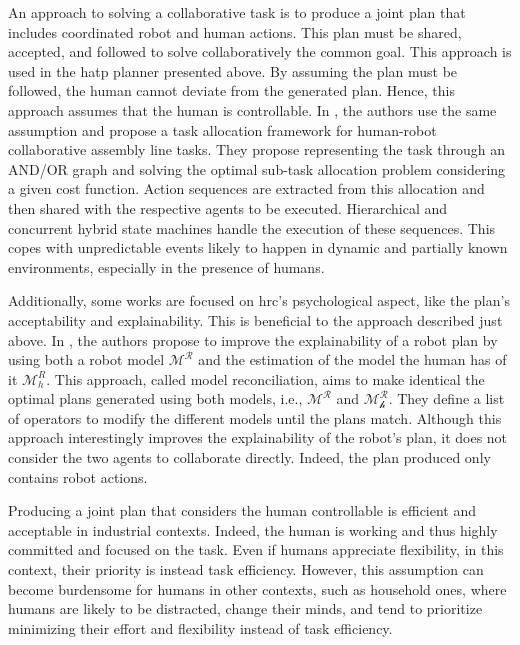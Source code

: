 An approach to solving a collaborative task is to produce a joint plan that includes coordinated robot and human actions. This plan must be shared, accepted, and followed to solve collaboratively the common goal. This approach is used in the \acrshort{hatp} planner presented above. By assuming the plan must be followed, the human cannot deviate from the generated plan. Hence, this approach assumes that the human is controllable. 
In \cite{johannsmeier2016hierarchical}, the authors use the same assumption and propose a task allocation framework for human-robot collaborative assembly line tasks. They propose representing the task through an AND/OR graph and solving the optimal sub-task allocation problem considering a given cost function. Action sequences are extracted from this allocation and then shared with the respective agents to be executed. Hierarchical and concurrent hybrid state machines handle the execution of these sequences. This copes with unpredictable events likely to happen in dynamic and partially known environments, especially in the presence of humans.  

Additionally, some works are focused on \acrshort{hrc}'s psychological aspect, like the plan's acceptability and explainability. This is beneficial to the approach described just above. In \cite{chakraborti_plan_2017}, the authors propose to improve the explainability of a robot plan by using both a robot model $\mathcal{M^R}$ and the estimation of the model the human has of it $\mathcal{M}^R_h$. This approach, called model reconciliation, aims to make identical the optimal plans generated using both models, i.e., $\mathcal{M^R}$ and $\mathcal{M^R_h}$. They define a list of operators to modify the different models until the plans match. 
Although this approach interestingly improves the explainability of the robot's plan, it does not consider the two agents to collaborate directly. Indeed, the plan produced only contains robot actions. 

Producing a joint plan that considers the human controllable is efficient and acceptable in industrial contexts. Indeed, the human is working and thus highly committed and focused on the task. Even if humans appreciate flexibility, in this context, their priority is instead task efficiency.
However, this assumption can become burdensome for humans in other contexts, such as household ones, where humans are likely to be distracted, change their minds, and tend to prioritize minimizing their effort and flexibility instead of task efficiency. 

